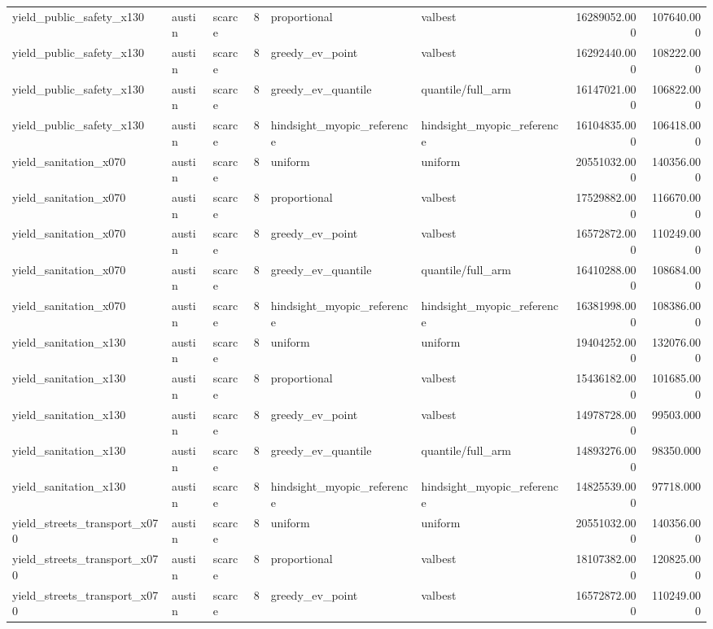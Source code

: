 \begin{tabular}{lllrllrr}
yield\_public\_safety\_x130 & austin & scarce & 8 & proportional & valbest & 16289052.000 & 107640.000 \\
yield\_public\_safety\_x130 & austin & scarce & 8 & greedy\_ev\_point & valbest & 16292440.000 & 108222.000 \\
yield\_public\_safety\_x130 & austin & scarce & 8 & greedy\_ev\_quantile & quantile/full\_arm & 16147021.000 & 106822.000 \\
yield\_public\_safety\_x130 & austin & scarce & 8 & hindsight\_myopic\_reference & hindsight\_myopic\_reference & 16104835.000 & 106418.000 \\
yield\_sanitation\_x070 & austin & scarce & 8 & uniform & uniform & 20551032.000 & 140356.000 \\
yield\_sanitation\_x070 & austin & scarce & 8 & proportional & valbest & 17529882.000 & 116670.000 \\
yield\_sanitation\_x070 & austin & scarce & 8 & greedy\_ev\_point & valbest & 16572872.000 & 110249.000 \\
yield\_sanitation\_x070 & austin & scarce & 8 & greedy\_ev\_quantile & quantile/full\_arm & 16410288.000 & 108684.000 \\
yield\_sanitation\_x070 & austin & scarce & 8 & hindsight\_myopic\_reference & hindsight\_myopic\_reference & 16381998.000 & 108386.000 \\
yield\_sanitation\_x130 & austin & scarce & 8 & uniform & uniform & 19404252.000 & 132076.000 \\
yield\_sanitation\_x130 & austin & scarce & 8 & proportional & valbest & 15436182.000 & 101685.000 \\
yield\_sanitation\_x130 & austin & scarce & 8 & greedy\_ev\_point & valbest & 14978728.000 & 99503.000 \\
yield\_sanitation\_x130 & austin & scarce & 8 & greedy\_ev\_quantile & quantile/full\_arm & 14893276.000 & 98350.000 \\
yield\_sanitation\_x130 & austin & scarce & 8 & hindsight\_myopic\_reference & hindsight\_myopic\_reference & 14825539.000 & 97718.000 \\
yield\_streets\_transport\_x070 & austin & scarce & 8 & uniform & uniform & 20551032.000 & 140356.000 \\
yield\_streets\_transport\_x070 & austin & scarce & 8 & proportional & valbest & 18107382.000 & 120825.000 \\
yield\_streets\_transport\_x070 & austin & scarce & 8 & greedy\_ev\_point & valbest & 16572872.000 & 110249.000 \\

\end{tabular}
